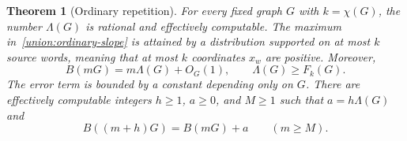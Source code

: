 \documentclass[10pt,a4paper]{amsart}
\numberwithin{equation}{section}
\newtheorem{theorem}{Theorem}[section]
\theoremstyle{definition}
\theoremstyle{remark}
\begin{document}
\begin{theorem}[Ordinary repetition]\label{union:ordinary-repetition}
For every fixed graph $G$ with $k=\chi(G)$, the number $\Lambda(G)$
is rational and effectively computable. The maximum
in~\eqref{union:ordinary-slope} is attained by a distribution supported
on at most $k$ source words, meaning that at most $k$ coordinates
$x_w$ are positive. Moreover,
\begin{equation}\label{union:ordinary-linear-growth}
B(mG)=m\Lambda(G)+O_G(1),\qquad \Lambda(G)\ge F_k(G).
\end{equation}
The error term is bounded by a constant depending only on $G$.
There are effectively computable integers $h\ge1$, $a\ge0$, and
$M\ge1$ such that $a=h\Lambda(G)$ and
\begin{equation}\label{union:ordinary-eventual-recurrence}
 B((m+h)G)=B(mG)+a\qquad(m\ge M).
\end{equation}
\end{theorem}
\end{document}
